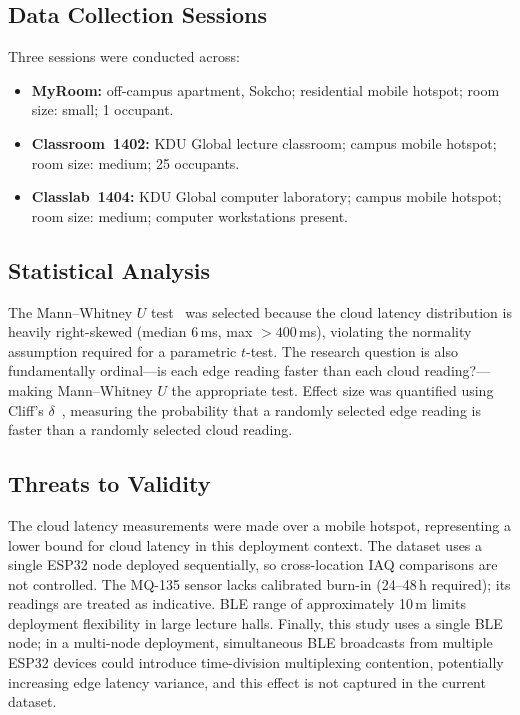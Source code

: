 \documentclass[12pt, a4paper]{article}
\newcommand{\ms}{\,ms}
\begin{document}
\subsection{Data Collection Sessions}

Three sessions were conducted across:
\begin{itemize}
  \item \textbf{MyRoom:} off-campus apartment, Sokcho; residential
  mobile hotspot; room size: small; 1 occupant.
  \item \textbf{Classroom~1402:} KDU Global lecture classroom; campus
  mobile hotspot; room size: medium; 25 occupants.
  \item \textbf{Classlab~1404:} KDU Global computer laboratory; campus
  mobile hotspot; room size: medium; computer workstations present.
\end{itemize}

\subsection{Statistical Analysis}

The Mann--Whitney $U$ test~\cite{mann1947} was selected because the
cloud latency distribution is heavily right-skewed (median 6\ms,
max $> 400$\ms), violating the normality assumption required for a
parametric $t$-test. The research question is also fundamentally
ordinal---is each edge reading faster than each cloud reading?---making
Mann--Whitney $U$ the appropriate test. Effect size was quantified
using Cliff's $\delta$~\cite{cliff1993}, measuring the probability
that a randomly selected edge reading is faster than a randomly
selected cloud reading.

\subsection{Threats to Validity}

The cloud latency measurements were made over a mobile hotspot,
representing a lower bound for cloud latency in this deployment
context. The dataset uses a single ESP32 node deployed sequentially,
so cross-location IAQ comparisons are not controlled. The MQ-135
sensor lacks calibrated burn-in (24--48\,h required); its readings are
treated as indicative. BLE range of approximately 10\,m limits
deployment flexibility in large lecture halls. Finally, this study
uses a single BLE node; in a multi-node deployment, simultaneous BLE
broadcasts from multiple ESP32 devices could introduce time-division
multiplexing contention, potentially increasing edge latency variance,
and this effect is not captured in the current dataset.
\end{document}
